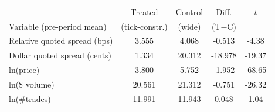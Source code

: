 \begin{tabular}{lcccc}
\toprule
 & Treated & Control & Diff. & $t$ \\
Variable (pre-period mean) & (tick-constr.) & (wide) & (T$-$C) & \\
\midrule
Relative quoted spread (bps) & 3.555 & 4.068 & -0.513 & -4.38 \\
Dollar quoted spread (cents) & 1.334 & 20.312 & -18.978 & -19.37 \\
ln(price) & 3.800 & 5.752 & -1.952 & -68.65 \\
ln(\$ volume) & 20.561 & 21.312 & -0.751 & -26.32 \\
ln(\#trades) & 11.991 & 11.943 & 0.048 & 1.04 \\
\bottomrule
\end{tabular}